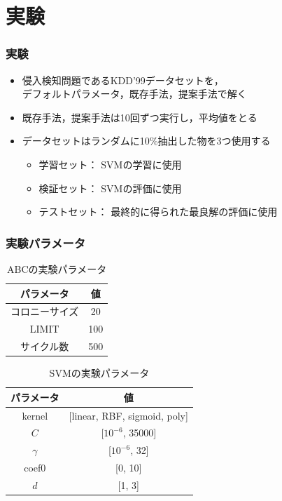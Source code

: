 \documentclass[11pt,dvipdfmx,cjk]{beamer}
\begin{document}
\section{実験}
\begin{frame}
  \frametitle{実験}
  \begin{itemize}
    \item 侵入検知問題であるKDD'99データセットを，\\デフォルトパラメータ，既存手法，提案手法で解く
   \item 既存手法，提案手法は10回ずつ実行し，平均値をとる
    \item データセットはランダムに10\%抽出した物を3つ使用する
    \begin{itemize}
      \item 学習セット： SVMの学習に使用
      \item 検証セット： SVMの評価に使用
      \item テストセット： 最終的に得られた最良解の評価に使用
    \end{itemize}
    
  \end{itemize}
\end{frame}


\begin{frame}
  \frametitle{実験パラメータ}
  \begin{table}[tb]
    \scriptsize
    \centering
    \caption{ABCの実験パラメータ}  %
    \begin{tabular}{|c|c|}  %
        \hline  %
        パラメータ & 値 \\  %
        \hline  %
        コロニーサイズ & 20 \\  %
        \hline  %
        LIMIT & 100 \\  %
        \hline  %
        サイクル数 & 500 \\  %
        \hline  %
    \end{tabular}
    \label{tab:abc_parameters}  %
\end{table}

\begin{table}[tb]
  \scriptsize
    \centering
    \caption{SVMの実験パラメータ}  %
    \begin{tabular}{|c|c|}  %
        \hline  %
        パラメータ & 値 \\  %
        \hline  %
        kernel & [linear, RBF, sigmoid, poly] \\  %
        \hline  %
        $C$ & [$10^{-6}$, 35000] \\  %
        \hline  %
        $\gamma$ & [$10^{-6}$, 32] \\  %
        \hline  %
        coef0 & [0, 10] \\  %
        \hline  %
        $d$ & [1, 3] \\  %
        \hline  %
    \end{tabular}
    \label{tab:svm_parameters}  %
\end{table}
\end{frame}
\end{document}
